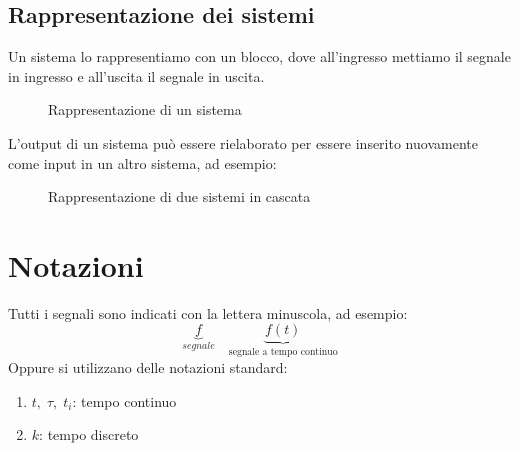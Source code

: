 \documentclass[a4paper]{article}
\begin{document}
\subsection{Rappresentazione dei sistemi}
Un sistema lo rappresentiamo con un blocco, dove all'ingresso mettiamo il segnale
in ingresso e all'uscita il segnale in uscita.
\begin{figure}[H]
  \centering
  \caption{Rappresentazione di un sistema}
\end{figure}

\noindent
L'output di un sistema può essere rielaborato per essere inserito nuovamente come
input in un altro sistema, ad esempio:

\begin{figure}[H]
  \centering
  \caption{Rappresentazione di due sistemi in cascata}
\end{figure}

\section{Notazioni}
Tutti i segnali sono indicati con la lettera minuscola, ad esempio:
\[
  \underbrace{f}_{segnale} \quad \underbrace{f(t)}_{\text{segnale a tempo continuo}}
\] 
Oppure si utilizzano delle notazioni standard:
\begin{enumerate}
  \item \( t,\;\tau,\;t_i \): tempo continuo
  \item \( k \): tempo discreto
\end{enumerate}
\end{document}
